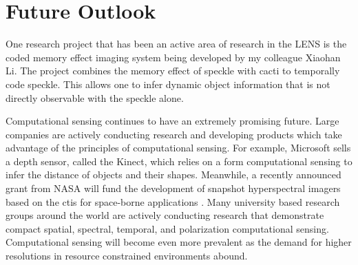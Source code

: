 \section{Future Outlook}


One research project that has been an active area of research in the \acrfull{LENS} is the coded memory effect imaging system being developed by my colleague Xiaohan Li. The project combines the memory effect of speckle with \acrfull{cacti} to temporally code speckle. This allows one to infer dynamic object information that is not directly observable with the speckle alone. 

Computational sensing continues to have an extremely promising future. Large companies are actively conducting research and developing products which take advantage of the principles of computational sensing. For example, Microsoft sells a depth sensor, called the Kinect, which relies on a form computational sensing to infer the distance of objects and their shapes. Meanwhile, a recently announced grant from NASA will fund the development of snapshot hyperspectral imagers based on the \acrfull{ctis} for space-borne applications \cite{ricespectraleyes2016grant}. Many university based research groups around the world are actively conducting research that demonstrate compact spatial, spectral, temporal, and polarization computational sensing. Computational sensing will become even more prevalent as the demand for higher resolutions in resource constrained environments abound. 
%  
%



